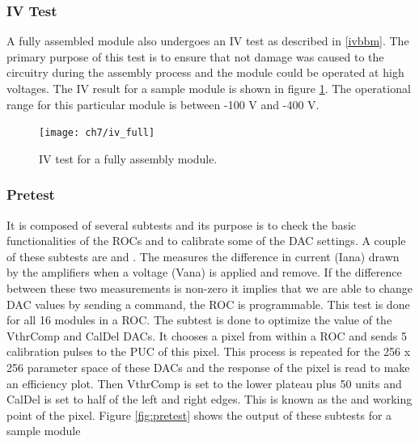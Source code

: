 \subsubsection{IV Test}
A fully assembled module also undergoes an IV test as described in \ref{ivbbm}. The primary purpose of this test is to ensure that not damage was caused to the circuitry during the assembly process and the module could be operated at high voltages. The IV result for a sample module is shown in figure \ref{ivfullmod}. The operational range for this particular module is between -100 V and -400 V.

\begin{figure}[!h]
	\centering
	\texttt{[image: ch7/iv\_full]}
  	\caption[IV results of a module]{IV test for a fully assembly module.}
  	\label{ivfullmod}
\end{figure}

\subsubsection{Pretest}
It is composed of several subtests and its purpose is to check the basic functionalities of the ROCs and to calibrate some of the DAC {} settings. A couple of these subtests are  and . The  measures the difference in current (Iana) drawn by the amplifiers when a voltage (Vana) is applied and remove. 
If the difference between these two measurements is non-zero it implies that we are able to change DAC values by sending a command, the ROC is programmable. This test is done for all 16 modules in a ROC. The  subtest is done to optimize the value of the VthrComp and CalDel DACs. It chooses a pixel from within a ROC and sends 5 calibration pulses to the PUC of this pixel. This process is repeated for the 256 x 256 parameter space of these DACs and the response of the pixel is read to make an efficiency plot. Then VthrComp is set to the lower plateau plus 50 units and CalDel is set to half of the left and right edges. This is known as the  and  working point of the pixel. Figure \ref{fig:pretest} shows the output of these subtests for a sample module

